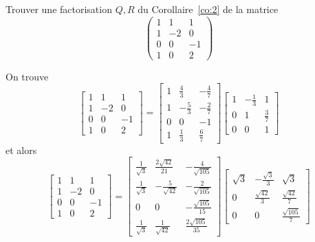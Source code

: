 \begin{example}
  \label{exe:8}
  Trouver une  factorisation $Q,R$ du Corollaire~\ref{co:2} de la matrice 
  \begin{displaymath}
    \left(\begin{matrix}1 & 1 & 1\\1 & -2 & 0\\0 & 0 & -1\\1 & 0 & 2\end{matrix}\right)
  \end{displaymath}

On trouve 
\begin{displaymath}
  \left[\begin{matrix}1 & 1 & 1\\1 & -2 & 0\\0 & 0 & -1\\1 & 0 & 2\end{matrix}\right]
= \left[\begin{matrix}1 & \frac{4}{3} & - \frac{4}{7}\\1 & - \frac{5}{3} & - \frac{2}{7}\\0 & 0 & -1\\1 & \frac{1}{3} & \frac{6}{7}\end{matrix}\right] 
\left[\begin{matrix}1 & - \frac{1}{3} & 1\\0 & 1 & \frac{3}{7}\\0 & 0 & 1\end{matrix}\right]
\end{displaymath}
et alors
\begin{displaymath}
   \left[\begin{matrix}1 & 1 & 1\\1 & -2 & 0\\0 & 0 & -1\\1 & 0 & 2\end{matrix}\right] = 
\left[\begin{matrix}\frac{1}{\sqrt{3}} & \frac{2 \sqrt{42}}{21} & - \frac{4 }{\sqrt{105}}\\\frac{1}{\sqrt{3}} & - \frac{5}{\sqrt{42}} & - \frac{2 }{\sqrt{105}}\\0 & 0 & -\frac{\sqrt{105}}{15}\\\frac{1}{\sqrt{3}} & \frac{1}{\sqrt{42}} & \frac{2 \sqrt{105}}{35}\end{matrix}\right] 
\left[\begin{matrix}\sqrt{3} & - \frac{\sqrt{3}}{3} & \sqrt{3}\\0 &\frac{\sqrt{42}}{3} & \frac{\sqrt{42}}{7}\\0 & 0 & \frac{\sqrt{105}}{7}\end{matrix}\right]
\end{displaymath}
\end{example} 





